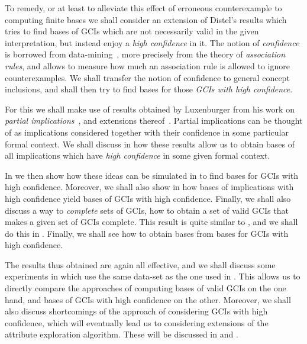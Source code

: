 To remedy, or at least to alleviate this effect of erroneous counterexample to computing
finite bases we shall consider an extension of Distel's results which tries to find bases
of GCIs which are not necessarily valid in the given interpretation, but instead enjoy a
\emph{high confidence} in it.  The notion of \emph{confidence} is borrowed from
data-mining~\cite{arules:agrawal:association-rules}, more precisely from the theory of
\emph{association rules}, and allows to measure how much an association rule is allowed to
ignore counterexamples.  We shall transfer the notion of confidence to general concept
inclusions, and shall then try to find bases for those \emph{GCIs with high confidence}.

For this we shall make use of results obtained by Luxenburger from his work on
\emph{partial implications}~\cite{diss:Luxenburger,Luxenburger91}, and extensions
thereof~\cite{DBLP:conf/ki/StummeTBPL01}.  Partial implications can be thought of as
implications considered together with their confidence in some particular formal context.
We shall discuss in  how these results allow us to obtain bases of all
implications which have \emph{high confidence} in some given formal context.

In  we then show how these ideas can be simulated in \ELgfpbot to
find bases for GCIs with high confidence.  Moreover, we shall also show in
 how bases of implications with high confidence yield bases
of GCIs with high confidence.  Finally, we shall also discuss a way to \emph{complete}
sets of GCIs, \ie how to obtain a set of valid GCIs that makes a given set of GCIs
complete.  This result is quite similar to , and we shall do this
in .  Finally, we shall see how to obtain \ELbot bases
from \ELgfpbot bases for GCIs with high confidence.

The results thus obtained are again all effective, and we shall discuss some experiments
in  which use the same data-set as the one used in
.  This allows us to directly compare the approaches of
computing bases of valid GCIs on the one hand, and bases of GCIs with high confidence on
the other.  Moreover, we shall also discuss shortcomings of the approach of considering
GCIs with high confidence, which will eventually lead us to considering extensions of the
attribute exploration algorithm.  These will be discussed in  and
.


